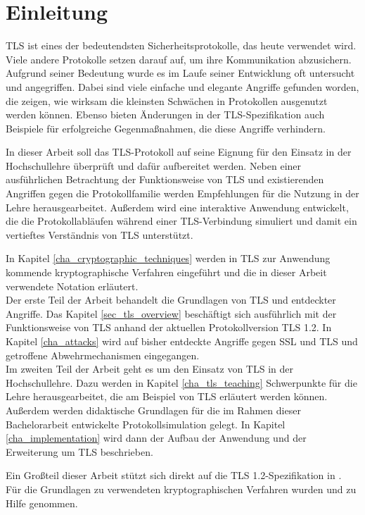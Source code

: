 \chapter{Einleitung}


TLS ist eines der bedeutendsten Sicherheitsprotokolle, das heute verwendet wird. Viele andere Protokolle setzen darauf auf, um ihre Kommunikation abzusichern. Aufgrund seiner Bedeutung wurde es im Laufe seiner Entwicklung oft untersucht und angegriffen. Dabei sind viele einfache und elegante Angriffe gefunden worden, die zeigen, wie wirksam die kleinsten Schwächen in Protokollen ausgenutzt werden können. Ebenso bieten Änderungen in der TLS-Spezifikation auch Beispiele für erfolgreiche Gegenmaßnahmen, die diese Angriffe verhindern.


In dieser Arbeit soll das TLS-Protokoll auf seine Eignung für den Einsatz in der Hochschullehre überprüft und dafür aufbereitet werden. 
Neben einer ausführlichen Betrachtung der Funktionsweise von TLS und existierenden Angriffen gegen die Protokollfamilie werden Empfehlungen für die Nutzung in der Lehre herausgearbeitet. Außerdem wird eine interaktive Anwendung entwickelt, die die Protokollabläufen während einer TLS-Verbindung simuliert und damit ein vertieftes Verständnis von TLS unterstützt.

In Kapitel \ref{cha_cryptographic_techniques} werden in TLS zur Anwendung kommende kryptographische Verfahren eingeführt und die in dieser Arbeit verwendete Notation erläutert. \\
Der erste Teil der Arbeit behandelt die Grundlagen von TLS und entdeckter Angriffe. Das Kapitel \ref{sec_tls_overview} beschäftigt sich ausführlich mit der Funktionsweise von TLS anhand der aktuellen Protokollversion TLS 1.2. In Kapitel \ref{cha_attacks} wird auf bisher entdeckte Angriffe gegen SSL und TLS und getroffene Abwehrmechanismen eingegangen.\\
Im zweiten Teil der Arbeit geht es um den Einsatz von TLS in der Hochschullehre. Dazu werden in Kapitel \ref{cha_tls_teaching} Schwerpunkte für die Lehre herausgearbeitet, die am Beispiel von TLS erläutert werden können. Außerdem werden didaktische Grundlagen für die im Rahmen dieser Bachelorarbeit entwickelte Protokollsimulation gelegt. In Kapitel \ref{cha_implementation} wird dann der Aufbau der Anwendung und der Erweiterung um TLS beschrieben.

Ein Großteil dieser Arbeit stützt sich direkt auf die TLS 1.2-Spezifikation in \cite{tls12}. Für die Grundlagen zu verwendeten kryptographischen Verfahren wurden \cite{Schneier2006} und \cite{ferguson10} zu Hilfe genommen. 

